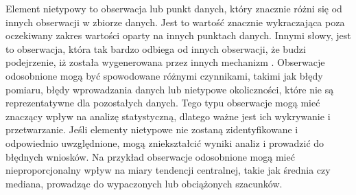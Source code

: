 \documentclass[12pt,a4paper,oneside]{book}
\theoremstyle{definition}
\begin{document}
Element nietypowy to obserwacja lub punkt danych, który znacznie różni się od innych obserwacji w zbiorze danych. Jest to wartość znacznie wykraczająca poza oczekiwany zakres wartości oparty na innych punktach danych. Innymi słowy, jest to obserwacja, która tak bardzo odbiega od innych obserwacji, że budzi podejrzenie, iż została wygenerowana przez innych mechanizm \cite{Hawkins_1980}. Obserwacje odosobnione mogą być spowodowane różnymi czynnikami, takimi jak błędy pomiaru, błędy wprowadzania danych lub nietypowe okoliczności, które nie są reprezentatywne dla pozostałych danych. Tego typu obserwacje mogą mieć znaczący wpływ na analizę statystyczną, dlatego ważne jest ich wykrywanie i przetwarzanie. Jeśli elementy nietypowe nie zostaną zidentyfikowane i odpowiednio uwzględnione, mogą zniekształcić wyniki analiz i prowadzić do błędnych wniosków. Na przykład obserwacje odosobnione mogą mieć nieproporcjonalny wpływ na miary tendencji centralnej, takie jak średnia czy mediana, prowadząc do wypaczonych lub obciążonych szacunków.
\end{document}
